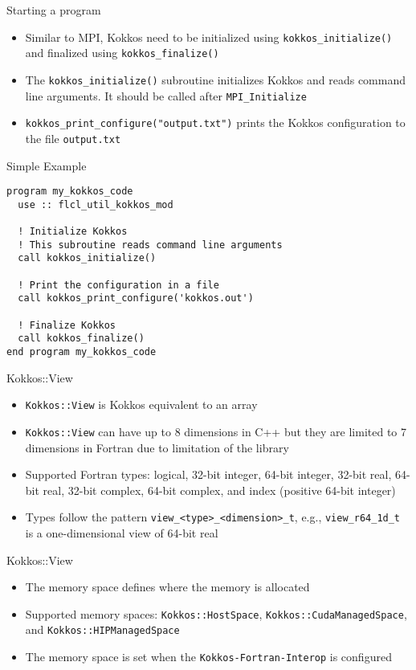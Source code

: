 \begin{frame}{Starting a program}
  \begin{itemize}
    \item Similar to MPI, Kokkos need to be initialized using
      \texttt{kokkos\_initialize()} and finalized using \texttt{kokkos\_finalize()}
    \item The \texttt{kokkos\_initialize()} subroutine initializes Kokkos and
      reads command line arguments. It should be called after
      \texttt{MPI\_Initialize}
    \item \texttt{kokkos\_print\_configure("output.txt")} prints the
      Kokkos configuration to the file \texttt{output.txt}
  \end{itemize}
\end{frame}

\begin{frame}[containsverbatim]{Simple Example}
  \begin{verbatim}
program my_kokkos_code
  use :: flcl_util_kokkos_mod

  ! Initialize Kokkos
  ! This subroutine reads command line arguments
  call kokkos_initialize()

  ! Print the configuration in a file
  call kokkos_print_configure('kokkos.out')

  ! Finalize Kokkos
  call kokkos_finalize()
end program my_kokkos_code
  \end{verbatim}
\end{frame}

\begin{frame}{Kokkos::View}
  \begin{itemize}
    \item \texttt{Kokkos::View} is Kokkos equivalent to an array
    \item \texttt{Kokkos::View} can have up to 8 dimensions in C++ but they are
      limited to 7 dimensions in Fortran due to limitation of the library
    \item Supported Fortran types: logical, 32-bit integer, 64-bit
      integer, 32-bit real, 64-bit real, 32-bit complex, 64-bit complex, and
      index (positive 64-bit integer)
    \item Types follow the pattern \texttt{view\_<type>\_<dimension>\_t}, e.g.,
      \texttt{view\_r64\_1d\_t} is a one-dimensional view of 64-bit real
  \end{itemize}
\end{frame}

\begin{frame}{Kokkos::View}
  \begin{itemize}
    \item The memory space defines where the memory is allocated
    \item Supported memory spaces: \texttt{Kokkos::HostSpace},
      \texttt{Kokkos::CudaManagedSpace}, and \texttt{Kokkos::HIPManagedSpace}
    \item The memory space is set when the \texttt{Kokkos-Fortran-Interop} is
      configured
  \end{itemize}
\end{frame}

